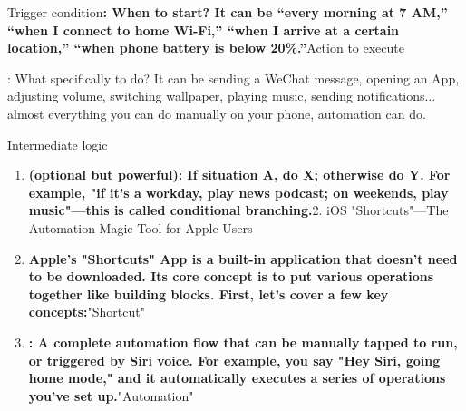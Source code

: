 


Trigger condition\textbf{: When to start? It can be “every morning at 7 AM,” “when I connect to home Wi-Fi,” “when I arrive at a certain location,” “when phone battery is below 20\%.”}Action to execute

: What specifically to do? It can be sending a WeChat message, opening an App, adjusting volume, switching wallpaper, playing music, sending notifications... almost everything you can do manually on your phone, automation can do.

Intermediate logic

\begin{enumerate}
  \item \textbf{(optional but powerful): If situation A, do X; otherwise do Y. For example, "if it's a workday, play news podcast; on weekends, play music"—this is called conditional branching.}2. iOS "Shortcuts"—The Automation Magic Tool for Apple Users
  \item \textbf{Apple's "Shortcuts" App is a built-in application that doesn't need to be downloaded. Its core concept is to put various operations together like building blocks. First, let's cover a few key concepts:}"Shortcut"
  \item \textbf{: A complete automation flow that can be manually tapped to run, or triggered by Siri voice. For example, you say "Hey Siri, going home mode," and it automatically executes a series of operations you've set up.}"Automation"
\end{enumerate}



